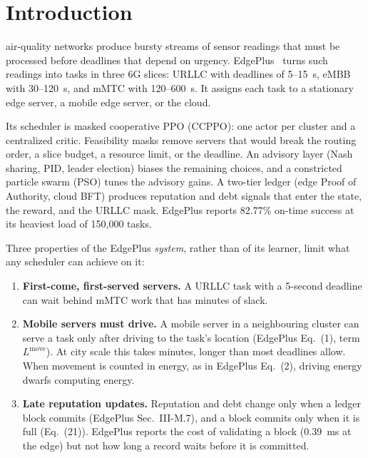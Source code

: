 \documentclass[11pt,journal,onecolumn]{IEEEtran}
\begin{document}
\section{Introduction}
\label{sec:intro}

 air-quality networks produce bursty streams of sensor readings that must be processed before deadlines that depend on urgency. EdgePlus~\cite{edgeplus} turns such readings into tasks in three 6G slices: URLLC with deadlines of 5--15~s, eMBB with 30--120~s, and mMTC with 120--600~s. It assigns each task to a stationary edge server, a mobile edge server, or the cloud.

Its scheduler is masked cooperative PPO (CCPPO): one actor per cluster and a centralized critic. Feasibility masks remove servers that would break the routing order, a slice budget, a resource limit, or the deadline. An advisory layer (Nash sharing, PID, leader election) biases the remaining choices, and a constricted particle swarm (PSO) tunes the advisory gains. A two-tier ledger (edge Proof of Authority, cloud BFT) produces reputation and debt signals that enter the state, the reward, and the URLLC mask. EdgePlus reports 82.77\% on-time success at its heaviest load of 150,000 tasks.

Three properties of the EdgePlus \emph{system}, rather than of its learner, limit what any scheduler can achieve on it:
\begin{enumerate}
\item \textbf{First-come, first-served servers.} A URLLC task with a 5-second deadline can wait behind mMTC work that has minutes of slack.
\item \textbf{Mobile servers must drive.} A mobile server in a neighbouring cluster can serve a task only after driving to the task's location (EdgePlus Eq.~(1), term $L^{\mathrm{move}}$). At city scale this takes minutes, longer than most deadlines allow. When movement is counted in energy, as in EdgePlus Eq.~(2), driving energy dwarfs computing energy.
\item \textbf{Late reputation updates.} Reputation and debt change only when a ledger block commits (EdgePlus Sec.~III-M.7), and a block commits only when it is full (Eq.~(21)). EdgePlus reports the cost of validating a block (0.39~ms at the edge) but not how long a record waits before it is committed.
\end{enumerate}
\end{document}
